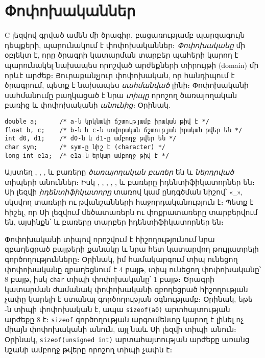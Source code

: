 \chapter{Փոփոխականներ}


C լեզվով գրված ամեն մի ծրագիր, բացառությամբ պարզագույն դեպքերի,
պարունակում է փոփոխականներ։ \emph{Փոփոխականը} մի օբյեկտ է, որը ծրագրի
կատարման տարբեր պահերի կարող է պարունակել նախապես որոշված արժեքների
տիրույթի (domain) մի որևէ արժեք։ Յուրաքանչյուր փոփոխական, որ հանդիպում է
ծրագրում, պետք է նախապես \emph{սահմանված} լինի։ Փոփոխականի սահմանումը
բաղկացած է նրա \emph{տիպը} որոշող ծառայողական բառից և փոփոխականի
\emph{անունից}։ Օրինակ.

\begin{Verbatim}
double a;      /* a-ն կրկնակի ճշտությամբ իրական թիվ է */
float b, c;    /* b-ն և c-ն սովորական ճշտության իրական թվեր են */
int d0, d1;    /* d0-ն և d1-ը ամբողջ թվեր են */
char sym;      /* sym-ը նիշ է (character) */
long int e1a;  /* e1a-ն երկար ամբողջ թիվ է */
\end{Verbatim}

Այստեղ , , ,  և 
բառերը \emph{ծառայողական բառեր} են և \emph{ներդրված} տիպերի անուններ։
Իսկ , , , , ,
 և  բառերը իդենտիֆիկատորներ են։ Սի լեզվի
\emph{իդենտիֆիկատորը} տառով կամ ընդգծման նիշով՝ «\verb|_|», սկսվող
տառերի ու թվանշանների հաջորդականություն է։ Պետք է հիշել, որ Սի լեզվում
մեծատառերն ու փոքրատառերը տարբերվում են, այսինքն՝  և
 բառերը տարբեր իդենտիֆիկատորներ են։

Փոփոխականի տիպով որոշվում է հիշողությունում նրա զբաղեցրած բայթերի
քանակը և նրա հետ կատարվող թույլատրելի գործողությունները։ Օրինակ, իմ
համակարգում  տիպ ունեցող փոփոխականը զբաղեցնում է 4 բայթ,
 տիպ ունեցող փոփոխականը՝ 8 բայթ, իսկ \texttt{char} տիպի
փոփոխականը՝ 1 բայթ։ Ծրագրի կատարման ժամանակ փոփոխականի զբողեցրած
հիշողության չափը կարելի է ստանալ  գործողության օգնությամբ։
Օրինակ, եթե -ն  տիպի փոփոխական է, ապա
\texttt{sizeof(a0)} արտհայտության արժեքը 8 է։ \texttt{sizeof}
գործողության արգումենտը կարող է լինել ոչ միայն փոփոխականի անուն, այլ
նաև Սի լեզվի տիպի անուն։ Օրինակ, \texttt{sizeof(unsigned int)}
արտահայտության արժեքը առանց նշանի ամբողջ թվերը որոշող տիպի չափն է։

